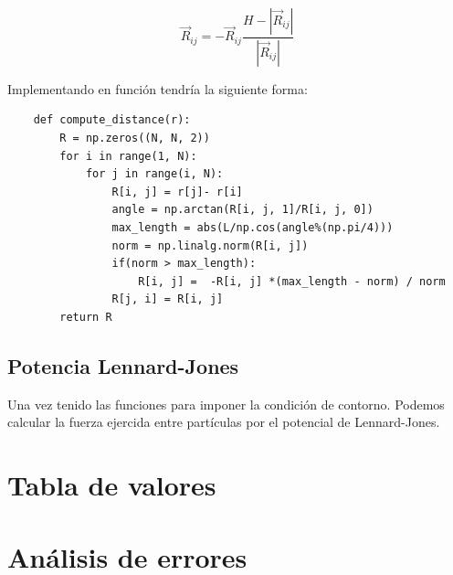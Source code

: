 \documentclass[11pt, twoside]{article} %
\begin{document}
\begin{equation}
    \vec{R}_{ij} = - \vec{R}_{ij} \frac{H-|\vec{R}_{ij}|}{|\vec{R}_{ij}|}
    \label{eq:redef_Rij}
\end{equation}

Implementando en función tendría la siguiente forma:

\begin{verbatim}
    def compute_distance(r):
        R = np.zeros((N, N, 2))
        for i in range(1, N):
            for j in range(i, N):
                R[i, j] = r[j]- r[i]
                angle = np.arctan(R[i, j, 1]/R[i, j, 0])
                max_length = abs(L/np.cos(angle%(np.pi/4)))
                norm = np.linalg.norm(R[i, j])
                if(norm > max_length):
                    R[i, j] =  -R[i, j] *(max_length - norm) / norm
                R[j, i] = R[i, j]
        return R
\end{verbatim}

\subsection{Potencia Lennard-Jones}

Una vez tenido las funciones para imponer la condición de contorno. Podemos
calcular la fuerza ejercida entre partículas por el potencial de Lennard-Jones.



\newpage

\appendix

\section{Tabla de valores}


\newpage

\section{Análisis de errores}
\end{document}

